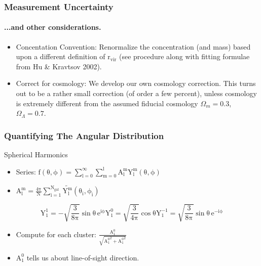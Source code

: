 \documentclass[hyperref={pdfpagelabels=false}]{beamer}
\begin{document}
\begin{frame}
\frametitle{Measurement Uncertainty}
\framesubtitle{...and other considerations.}
\begin{itemize}
\item Concentation Convention: Renormalize the concentration (and mass) based
  upon a different definition of $\mathrm{r_{vir}}$ (see procedure along with
  fitting formulae from Hu \& Kravtsov 2002).
\item Correct for cosmology: We develop our own cosmology correction. This
  turns out to be a rather small correction (of order a few percent), unless
  cosmology is extremely different from the assumed fiducial cosmology
  $\Omega_{m} = 0.3$, $\Omega_{\Lambda} = 0.7$.
\end{itemize}
\end{frame}

\begin{frame}
\frametitle{Quantifying The Angular Distribution}
\begin{block}{\centering Spherical Harmonics}
  \begin{itemize}
  \item Series: $\mathrm{f(\theta,\phi) = \sum_{l=0}^{\infty} \sum_{m=0}^{l} A_{l}^{m}
      Y_{l}^{m} (\theta,\phi)}$
  \item $\mathrm{A_{l}^{m} = \frac{4\pi}{N} \sum_{i=1}^{N_{gal}} \tilde{Y_{l}^{m}}(\theta_{i},\phi_{i})}$
  \end{itemize}
  \begin{subequations}
    \begin{equation*}
      \mathrm{Y_{1}^{1} = -\sqrt{\frac{3}{8\pi}} \sin \theta \,e^{i\phi}}
    \end{equation*}    
    \begin{equation*}
      \mathrm{Y_{1}^{0} = \sqrt{\frac{3}{4\pi}} \cos \theta}
    \end{equation*}
   \begin{equation*}
      \mathrm{Y_{1}^{-1} = \sqrt{\frac{3}{8\pi}} \sin \theta \,e^{-i\phi}}
    \end{equation*}
 \end{subequations}
 \begin{itemize}
 \item Compute for each cluster: $\mathrm{\frac{A_{1}^{0}}{\sqrt{{A_{1}^{0}}^{2}+{A_{1}^{0}}^{2}}}}$
 \item $\mathrm{A_{1}^{0}}$ tells us about line-of-sight direction.
 \end{itemize}
\end{block}
\end{frame}
\end{document}
